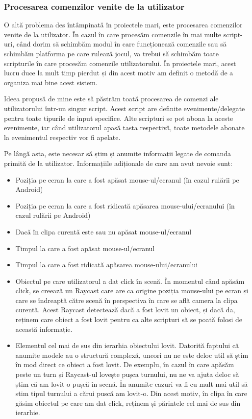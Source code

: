 \documentclass[12pt, a4paper]{article}
\begin{document}
	
	
	
	
	\subsubsection{Procesarea comenzilor venite de la utilizator}
	
	O altă problema des întâmpinată în proiectele mari, este procesarea comenzilor venite de la utilizator. În cazul în care procesăm comenzile în mai multe script-uri, când dorim să schimbăm modul în care funcționează comenzile sau să schimbăm platforma pe care rulează jocul, va trebui să schimbăm toate scripturile în care procesăm comenzile utilizatorului. În proiectele mari, acest lucru duce la mult timp pierdut și din acest motiv am definit o metodă de a organiza mai bine acest sistem.
	\newline
	
	Ideea propusă de mine este să păstrăm toată procesarea de comenzi ale utilizatorului într-un singur script. Acest script are definite evenimente/delegate pentru toate tipurile de input specifice. Alte scripturi se pot abona la aceste evenimente, iar când utilizatorul apasă tasta respectivă, toate metodele abonate la evenimentul respectiv vor fi apelate.
	\newline
	
	Pe lângă asta, este necesar să știm și anumite informații legate de comanda primită de la utilizator. Informațiile adiționale de care am avut nevoie sunt:
	
	\begin{itemize}
		\item Poziția pe ecran la care a fost apăsat mouse-ul/ecranul (în cazul rulării pe Android)
		\item Poziția pe ecran la care a fost ridicată apăsarea mouse-ului/ecranului (în cazul rulării pe Android)
		\item Dacă în clipa curentă este sau nu apăsat mouse-ul/ecranul
		\item Timpul la care a fost apăsat mouse-ul/ecranul
		\item Timpul la care a fost ridicată apăsarea mouse-ului/ecranului
		\item Obiectul pe care utilizatorul a dat click în scenă. În momentul când apăsăm click, se creează un Raycast care are ca origine poziția mouse-ului pe ecran și care se îndreaptă către scenă în perspectiva în care se află camera la clipa curentă. Acest Raycast detectează dacă a fost lovit un obiect, și dacă da, reținem care obiect a fost lovit pentru ca alte scripturi să se poată folosi de această informație.
		\item Elementul cel mai de sus din ierarhia obiectului lovit. Datorită faptului că anumite modele au o structură complexă, uneori nu ne este deloc util să știm în mod direct ce obiect a fost lovit. De exemplu, în cazul în care apăsăm peste un turn și Raycast-ul lovește pușca turnului, nu ne va ajuta deloc să știm că am lovit o pușcă în scenă. În anumite cazuri va fi cu mult mai util să stim tipul turnului a cărui puscă am lovit-o. Din acest motiv, în clipa în care găsim obiectul pe care am dat click, reținem și părintele cel mai de sus din ierarhie.
	\end{itemize}
	
\end{document}
